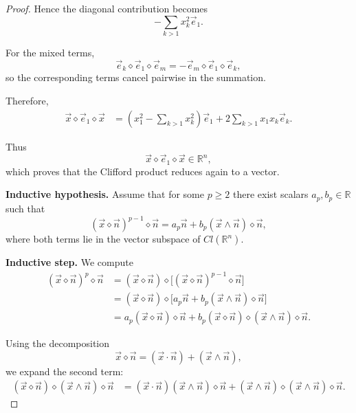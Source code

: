 \documentclass{amsart}
\theoremstyle{plain}
\numberwithin{equation}{section}
\begin{document}
\begin{proof}
Hence the diagonal contribution becomes
\[
-\sum_{k>1}x_k^2\vec e_1.
\]

For the mixed terms,
\[
\vec e_k\diamond \vec e_1\diamond \vec e_m
=
-
\vec e_m\diamond \vec e_1\diamond \vec e_k,
\]
so the corresponding terms cancel pairwise in the summation.

Therefore,
\begin{align*}
\vec{x}\diamond \vec{e}_{1}\diamond \vec{x}
&=
\left(
x_{1}^{2}
-
\sum_{k>1}x_{k}^{2}
\right)\vec e_1
+
2\sum_{k>1}x_{1}x_{k}\vec e_k.
\end{align*}

Thus
\[
\vec{x}\diamond \vec{e}_{1}\diamond \vec{x}
\in \mathbb R^n,
\]
which proves that the Clifford product reduces again to a vector.


\textbf{Inductive hypothesis.}
Assume that for some $p \ge 2$ there exist scalars $a_p,b_p \in \mathbb{R}$
such that
\[
(\vec x \diamond \vec n)^{p-1} \diamond \vec n
=
a_p \vec n + b_p (\vec x \wedge \vec n)\diamond \vec n,
\]
where both terms lie in the vector subspace of $Cl(\mathbb{R}^n)$.

\textbf{Inductive step.}
We compute
\begin{align*}
(\vec x \diamond \vec n)^p \diamond \vec n
&=
(\vec x \diamond \vec n)
\diamond
\big[(\vec x \diamond \vec n)^{p-1} \diamond \vec n\big] \\[4pt]
&=
(\vec x \diamond \vec n)
\diamond
\big[a_p \vec n + b_p (\vec x \wedge \vec n)\diamond \vec n\big] \\[4pt]
&=
a_p (\vec x \diamond \vec n)\diamond \vec n
+
b_p (\vec x \diamond \vec n)\diamond (\vec x \wedge \vec n)\diamond \vec n.
\end{align*}

Using the decomposition
\[
\vec x \diamond \vec n = (\vec x \cdot \vec n) + (\vec x \wedge \vec n),
\]
we expand the second term:
\begin{align*}
(\vec x \diamond \vec n)\diamond (\vec x \wedge \vec n)\diamond \vec n
&=
(\vec x \cdot \vec n)(\vec x \wedge \vec n)\diamond \vec n
+
(\vec x \wedge \vec n)\diamond (\vec x \wedge \vec n)\diamond \vec n.
\end{align*}


\end{proof}
\end{document}
